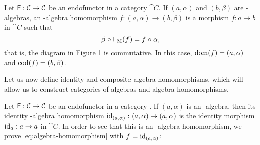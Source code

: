 \begin{definition}
  \label{def:algebra-homomorphism}


  Let $\mathsf{F}: \mathcal{C} \to \mathcal{C}$ be an endofunctor in a category
  $\cat{C}$. If $(a,\alpha)$ and $(b,\beta)$ are -algebras, an
  -algebra homomorphism $f: (a,\alpha) \to (b,\beta)$ is a
  morphism $f: a \to b$ in $\cat{C}$ such that
  \begin{equation}
    \label{eq:algebra-homomorphism}
    \beta \mathrel{\circ} \mathsf{F}_{\operatorname{M}}(f) = f \mathrel{\circ} \alpha
    \text{,}
  \end{equation}
  that is, the diagram in Figure \ref{fig:algebra-homomorphism} is
  commutative. In this case, $\operatorname{dom}(f) = (a,\alpha)$ and $\operatorname{cod}(f) =
  (b,\beta)$.

  \begin{figure}[htb]
    \begin{center}
    \end{center}
    \caption{}
    \label{fig:algebra-homomorphism}
  \end{figure}

\end{definition}

Let us now define identity and composite algebra homomorphisms, which
will allow us to construct categories of algebras and algebra
homomorphisms.

\begin{definition}
  \label{def:identity-algebra-homomorphism}

  Let $\mathsf{F}: \mathcal{C} \to \mathcal{C}$ be an endofunctor in a category
  . If $(a,\alpha)$ is an -algebra, then its identity
  -algebra homomorphism $\operatorname{id}_{(a,\alpha)}: (a,\alpha) \to
  (a,\alpha)$ is the identity morphism $\operatorname{id}_{a}: a \to a$ in
  $\cat{C}$. In order to see that this is an -algebra
  homomorphism, we prove \eqref{eq:algebra-homomorphism} with $f =
  \operatorname{id}_{(a,\alpha)}$:
  \begin{steps}
      \eqby{\eqref{eq:functor-identity}}
  \end{steps}

\end{definition}

